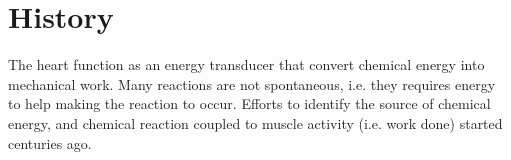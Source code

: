 % 
% 


\section{History}
\label{sec:history-energy-metabolism-mechanism}
\label{sec:energy-history-metabolism-mechanism}

The heart function as an energy transducer that convert chemical energy into
mechanical work. Many reactions are not spontaneous, i.e. they requires energy
to help making the reaction to occur. Efforts to identify the source of chemical
energy, and chemical reaction coupled to muscle activity (i.e. work done)
started centuries ago.

